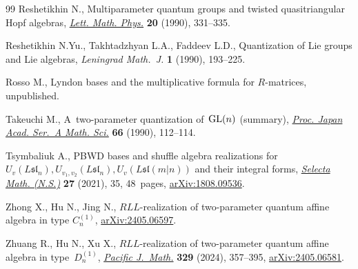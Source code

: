 \documentclass[pdftex]{sigma}
\numberwithin{equation}{section}
\begin{document}
\begin{thebibliography}{99}
Reshetikhin N., Multiparameter quantum groups and twisted quasitriangular
 {H}opf algebras, \href{https://doi.org/10.1007/BF00626530}{\textit{Lett.
 Math. Phys.}} \textbf{20} (1990), 331--335.

Reshetikhin N.Yu., Takhtadzhyan L.A., Faddeev L.D., Quantization of {L}ie groups
 and {L}ie algebras, \textit{Leningrad Math.~J.} \textbf{1} (1990), 193--225.

Rosso M., Lyndon bases and the multiplicative formula for $R$-matrices,
 {u}npublished.

Takeuchi M., A~two-parameter quantization of~{${\rm GL}(n)$} (summary),
 \href{https://doi.org/10.3792/pjaa.66.112}{\textit{Proc. Japan Acad. Ser.~A
 Math. Sci.}} \textbf{66} (1990), 112--114.

Tsymbaliuk A., P{BWD} bases and shuffle algebra realizations for
 {$U_v(L\mathfrak{sl}_n), U_{v_1, v_2}(L\mathfrak{sl}_n),
 U_v(L\mathfrak{sl}(m|n))$} and their integral forms,
 \href{https://doi.org/10.1007/s00029-021-00634-5}{\textit{Selecta Math.
 (N.S.)}} \textbf{27} (2021), 35, 48~pages,
 \href{http://arxiv.org/abs/1808.09536}{arXiv:1808.09536}.

Zhong X., Hu N., Jing N., $RLL$-realization of two-parameter quantum affine
 algebra in type $C^{(1)}_n$,
 \href{http://arxiv.org/abs/2405.06597}{arXiv:2405.06597}.

Zhuang R., Hu N., Xu X., {$RLL$}-realization of two-parameter quantum affine
 algebra in type~{$D_n^{(1)}$},
 \href{https://doi.org/10.2140/pjm.2024.329.357}{\textit{Pacific J.~Math.}}
 \textbf{329} (2024), 357--395,
 \href{http://arxiv.org/abs/2405.06581}{arXiv:2405.06581}.

\end{thebibliography}\LastPageEnding
\end{document}
